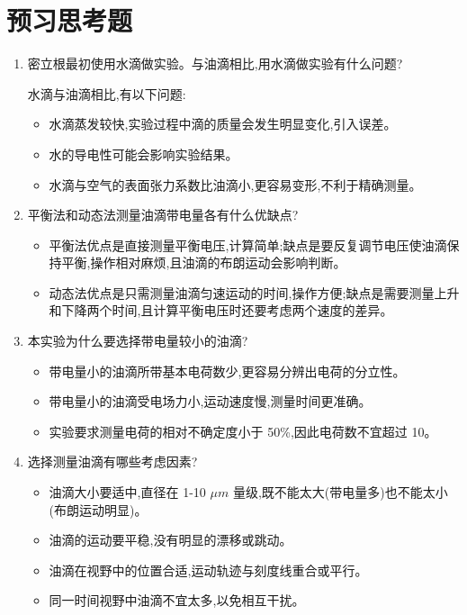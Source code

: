 \documentclass[UTF8]{ctexart}
\begin{document}
\section{预习思考题}
\begin{enumerate}
    \item 密立根最初使用水滴做实验。与油滴相比,用水滴做实验有什么问题?
    
    水滴与油滴相比,有以下问题:
    \begin{itemize}
      \item 水滴蒸发较快,实验过程中滴的质量会发生明显变化,引入误差。
      \item 水的导电性可能会影响实验结果。
      \item 水滴与空气的表面张力系数比油滴小,更容易变形,不利于精确测量。
    \end{itemize}
  
    \item 平衡法和动态法测量油滴带电量各有什么优缺点?
    \begin{itemize}
      \item 平衡法优点是直接测量平衡电压,计算简单;缺点是要反复调节电压使油滴保持平衡,操作相对麻烦,且油滴的布朗运动会影响判断。
      \item 动态法优点是只需测量油滴匀速运动的时间,操作方便;缺点是需要测量上升和下降两个时间,且计算平衡电压时还要考虑两个速度的差异。
    \end{itemize}
  
    \item 本实验为什么要选择带电量较小的油滴?
    \begin{itemize}
      \item 带电量小的油滴所带基本电荷数少,更容易分辨出电荷的分立性。
      \item 带电量小的油滴受电场力小,运动速度慢,测量时间更准确。
      \item 实验要求测量电荷的相对不确定度小于 50\%,因此电荷数不宜超过 10。
    \end{itemize}
     
    \item 选择测量油滴有哪些考虑因素?
    \begin{itemize}  
      \item 油滴大小要适中,直径在 1-10 $\mu m$ 量级,既不能太大(带电量多)也不能太小(布朗运动明显)。
      \item 油滴的运动要平稳,没有明显的漂移或跳动。
      \item 油滴在视野中的位置合适,运动轨迹与刻度线重合或平行。
      \item 同一时间视野中油滴不宜太多,以免相互干扰。
    \end{itemize}
  \end{enumerate}


\end{document}
